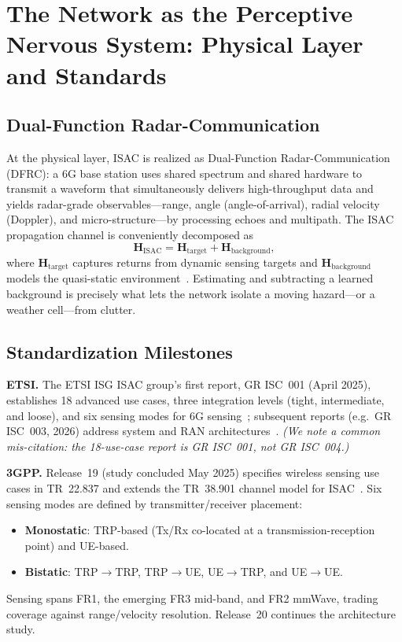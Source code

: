 \documentclass[10pt,twocolumn]{article}
\begin{document}
\section{The Network as the Perceptive Nervous System: Physical Layer and Standards}
\label{sec:physical}

\subsection{Dual-Function Radar-Communication}
At the physical layer, ISAC is realized as Dual-Function Radar-Communication
(DFRC): a 6G base station uses shared spectrum and shared hardware to transmit a
waveform that simultaneously delivers high-throughput data and yields
radar-grade observables---range, angle (angle-of-arrival), radial velocity
(Doppler), and micro-structure---by processing echoes and multipath. The ISAC
propagation channel is conveniently decomposed as
\begin{equation}
\mathbf{H}_{\mathrm{ISAC}} = \mathbf{H}_{\mathrm{target}} +
\mathbf{H}_{\mathrm{background}},
\end{equation}
where $\mathbf{H}_{\mathrm{target}}$ captures returns from dynamic sensing
targets and $\mathbf{H}_{\mathrm{background}}$ models the quasi-static
environment~\cite{tr38901,rel19survey}. Estimating and subtracting a learned
background is precisely what lets the network isolate a moving hazard---or a
weather cell---from clutter.

\subsection{Standardization Milestones}
\textbf{ETSI.} The ETSI ISG ISAC group's first report, GR ISC~001 (April 2025),
establishes 18 advanced use cases, three integration levels (tight,
intermediate, and loose), and six sensing modes for 6G
sensing~\cite{etsi_isc001}; subsequent reports (e.g.\ GR ISC~003, 2026) address
system and RAN architectures~\cite{etsi_isc003}. \emph{(We note a common
mis-citation: the 18-use-case report is GR ISC~001, not GR ISC~004.)}

\noindent\textbf{3GPP.} Release~19 (study concluded May 2025) specifies wireless
sensing use cases in TR~22.837 and extends the TR~38.901 channel model for
ISAC~\cite{tr22837,tr38901}. Six sensing modes are defined by
transmitter/receiver placement:
\begin{itemize}
\item \textbf{Monostatic}: TRP-based (Tx/Rx co-located at a
transmission-reception point) and UE-based.
\item \textbf{Bistatic}: TRP$\rightarrow$TRP, TRP$\rightarrow$UE,
UE$\rightarrow$TRP, and UE$\rightarrow$UE.
\end{itemize}
Sensing spans FR1, the emerging FR3 mid-band, and FR2 mmWave, trading coverage
against range/velocity resolution. Release~20 continues the architecture study.
\end{document}
